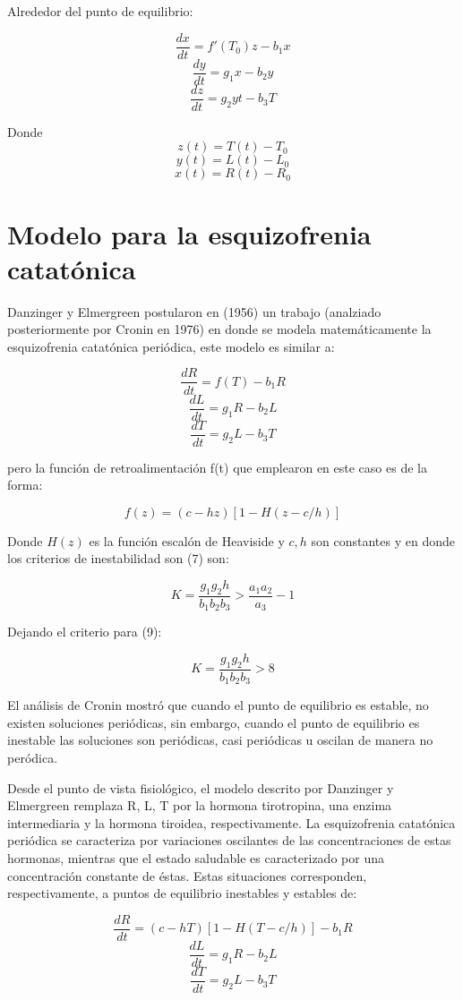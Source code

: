 \documentclass[letter,11pt]{article}
\begin{document}
Alrededor del punto de equilibrio:

$$ \frac{dx}{dt} = f'(T_{0})z-b_{1}x$$
$$ \frac{dy}{dt} = g_{1}x-b_{2}y $$
$$ \frac{dz}{dt} = g_{2}yt-b_{3}T $$

Donde
$$ z(t)=T(t)-T_{0} $$
$$ y(t)=L(t)-L_{0} $$
$$ x(t)=R(t)-R_{0} $$

\section*{Modelo para la esquizofrenia catatónica}

Danzinger y Elmergreen postularon en (1956) un trabajo (analziado posteriormente por Cronin en 1976) en donde se modela matemáticamente la esquizofrenia catatónica periódica, este modelo es similar a:

$$ \frac{dR}{dt} = f(T)-b_{1}R$$
$$ \frac{dL}{dt} = g_{1}R-b_{2}L $$
$$ \frac{dT}{dt} = g_{2}L-b_{3}T $$

pero la función de retroalimentación f(t) que emplearon en este caso es de la forma:

$$ f(z) = (c-hz)[1-H(z-c/h)]  $$

Donde $H(z)$ es la función escalón de Heaviside y $c,h$ son constantes y en donde los criterios de inestabilidad son (7) son:

$$ K = \dfrac{g_1 g_2 h}{b_1 b_2 b_3} > \dfrac{a_1 a_2}{a_3} - 1 $$

Dejando el criterio para (9):

$$ K = \dfrac{g_1 g_2 h}{b_1 b_2 b_3} > 8 $$ 

El análisis de Cronin mostró que cuando el punto de equilibrio es estable, no existen soluciones periódicas, sin embargo, cuando el punto de equilibrio es inestable las soluciones son periódicas, casi periódicas u oscilan de manera no peródica.

Desde el punto de vista fisiológico, el modelo descrito por Danzinger y Elmergreen remplaza R, L, T por la hormona tirotropina, una enzima intermediaria y la hormona tiroidea, respectivamente. La esquizofrenia catatónica periódica se caracteriza por variaciones oscilantes de las concentraciones de estas hormonas, mientras que el estado saludable es caracterizado por una concentración constante de éstas. Estas situaciones corresponden, respectivamente, a puntos de equilibrio inestables y estables de:  

$$ \frac{dR}{dt} = (c-hT)[1-H(T-c/h)]-b_{1}R$$
$$ \frac{dL}{dt} = g_{1}R-b_{2}L $$
$$ \frac{dT}{dt} = g_{2}L-b_{3}T $$
\end{document}
